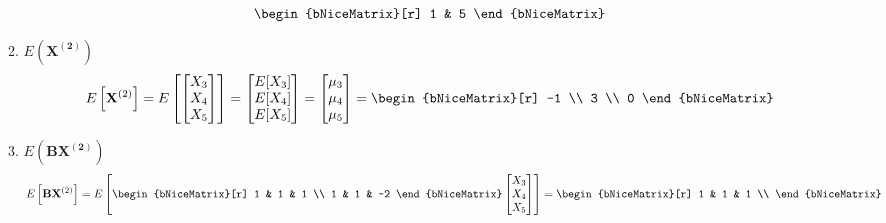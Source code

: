 \begin{enumerate}[font=\bfseries]
\begin{enumerate}
\[\begin{bNiceMatrix}[r]
                    1 & 5
                \end{bNiceMatrix}
            \]
            \item $E\left(\mathbf{X^{(2)}}\right)$
            \[
                E\left[\mathbf{X}^{(2)}\right]
                = 
                E\left[
                    \begin{bmatrix}
                        X_3 \\
                        X_4 \\
                        X_5
                    \end{bmatrix}
                \right]
                =
                \begin{bmatrix}
                    E[X_3] \\
                    E[X_4] \\
                    E[X_5]
                \end{bmatrix}
                =
                \begin{bmatrix}
                    \mu_3 \\
                    \mu_4 \\
                    \mu_5
                \end{bmatrix}
                =\begin{bNiceMatrix}[r]
                    -1 \\
                    3 \\
                    0
                \end{bNiceMatrix}
            \]
            \item $E\left(\mathbf{B}\mathbf{X^{(2)}}\right)$
            \[
                E\left[\mathbf{B}\mathbf{X}^{(2)}\right]
                =
                E\left[
                    \begin{bNiceMatrix}[r]
                        1 & 1 & 1 \\
                        1 & 1 & -2
                    \end{bNiceMatrix}
                    \begin{bmatrix}
                        X_3 \\
                        X_4 \\
                        X_5
                    \end{bmatrix}
                \right]
                =
                \begin{bNiceMatrix}[r]
                    1 & 1 & 1 \\

\end{bNiceMatrix}\]
\end{enumerate}
\end{enumerate}
